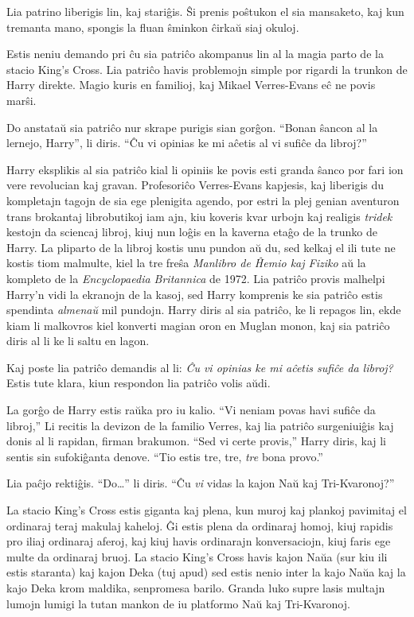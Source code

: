 Lia patrino liberigis lin, kaj stariĝis. Ŝi prenis poŝtukon el sia
mansaketo, kaj kun tremanta mano, spongis la fluan ŝminkon ĉirkaŭ siaj
okuloj.

Estis neniu demando pri ĉu sia patriĉo akompanus lin al la magia parto
de la stacio King's Cross. Lia patriĉo havis problemojn simple por
rigardi la trunkon de Harry direkte. Magio kuris en familioj, kaj
Mikael Verres-Evans eĉ ne povis marŝi.

Do anstataŭ sia patriĉo nur skrape purigis sian gorĝon.  ``Bonan
ŝancon al la lernejo, Harry'', li diris. ``Ĉu vi opinias ke mi aĉetis
al vi sufiĉe da libroj?''

Harry eksplikis al sia patriĉo kial li opiniis ke povis esti granda
ŝanco por fari ion vere revolucian kaj gravan. Profesoriĉo
Verres-Evans kapjesis, kaj liberigis du kompletajn tagojn de sia ege
plenigita agendo, por estri la plej genian aventuron trans brokantaj
librobutikoj iam ajn, kiu koveris kvar urbojn kaj realigis
\emph{tridek} kestojn da sciencaj libroj, kiuj nun loĝis en la kaverna
etaĝo de la trunko de Harry. La pliparto de la libroj kostis unu
pundon aŭ du, sed kelkaj el ili tute ne kostis tiom malmulte, kiel la
tre freŝa \emph{Manlibro de Ĥemio kaj Fiziko} aŭ la kompleto de la
\emph{Encyclopaedia Britannica} de 1972. Lia patriĉo provis malhelpi
Harry'n vidi la ekranojn de la kasoj, sed Harry komprenis ke sia
patriĉo estis spendinta \emph{almenaŭ} mil pundojn. Harry diris al sia
patriĉo, ke li repagos lin, ekde kiam li malkovros kiel konverti
magian oron en Muglan monon, kaj sia patriĉo diris al li ke li saltu
en lagon.

Kaj poste lia patriĉo demandis al li: \emph{Ĉu vi opinias ke mi aĉetis
sufiĉe da libroj?} Estis tute klara, kiun respondon lia patriĉo volis
aŭdi.

La gorĝo de Harry estis raŭka pro iu kalio. ``Vi neniam povas havi
sufiĉe da libroj,'' Li recitis la devizon de la familio Verres, kaj
lia patriĉo surgeniuiĝis kaj donis al li rapidan, firman
brakumon. ``Sed vi certe provis,'' Harry diris, kaj li sentis sin
sufokiĝanta denove. ``Tio estis tre, tre, \emph{tre} bona provo.''

Lia paĉjo rektiĝis. ``Do\ldots'' li diris. ``Ĉu \emph{vi} vidas la kajon
Naŭ kaj Tri-Kvaronoj?''

La stacio King's Cross estis giganta kaj plena, kun muroj kaj plankoj
pavimitaj el ordinaraj teraj makulaj kaheloj. Ĝi estis plena da
ordinaraj homoj, kiuj rapidis pro iliaj ordinaraj aferoj, kaj kiuj
havis ordinarajn konversaciojn, kiuj faris ege multe da ordinaraj
bruoj. La stacio King's Cross havis kajon Naŭa (sur kiu ili estis
staranta) kaj kajon Deka (tuj apud) sed estis nenio inter la kajo Naŭa
kaj la kajo Deka krom maldika, senpromesa barilo. Granda luko supre
lasis multajn lumojn lumigi la tutan mankon de iu platformo Naŭ kaj
Tri-Kvaronoj.

